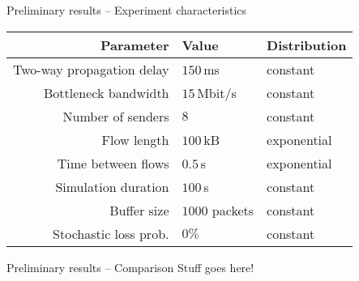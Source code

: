 \documentclass[11pt]{beamer}
\begin{document}
\begin{frame}{Preliminary results -- Experiment characteristics}
\centering
\begin{tabular}{rll}
\toprule
Parameter & Value & Distribution \\
\midrule
Two-way propagation delay & $150\,$ms & constant \\
Bottleneck bandwidth & $15\,$Mbit/s & constant \\
Number of senders & $8$ & constant \\
Flow length & $100\,$kB & exponential \\
Time between flows & $0.5\,$s & exponential \\
Simulation duration & $100\,$s & constant \\
Buffer size & $1000$ packets & constant \\
Stochastic loss prob. & $0\%$ & constant \\
\bottomrule
\end{tabular}
\end{frame}

\begin{frame}{Preliminary results -- Comparison}
Stuff goes here!
\end{frame}
\end{document}

